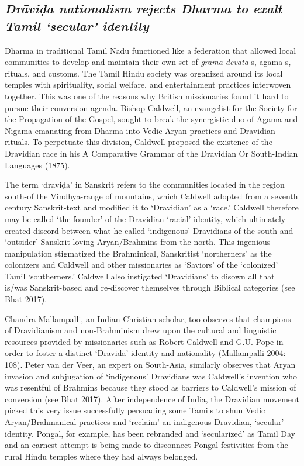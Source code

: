 \subsection*{\textit{Drāviḍa nationalism rejects Dharma to exalt Tamil ‘secular’ identity }}

\vskip -10pt

Dharma in traditional Tamil Nadu functioned like a federation that allowed local communities to develop and maintain their own set of \textit{grāma devatā}-s, āgama-s, rituals, and customs. The Tamil Hindu society was organized around its local temples with spirituality, social welfare, and entertainment practices interwoven together. This was one of the reasons why British missionaries found it hard to pursue their conversion agenda. Bishop Caldwell, an evangelist for the Society for the Propagation of the Gospel, sought to break the synergistic duo of Āgama and Nigama emanating from Dharma into Vedic Aryan practices and Dravidian rituals. To perpetuate this division, Caldwell proposed the existence of the Dravidian race in his A Comparative Grammar of the Dravidian Or South-Indian Languages (1875).

The term ‘draviḍa’ in Sanskrit refers to the communities located in the region south-of the Vindhya-range of mountains, which Caldwell adopted from a seventh century Sanskrit-text and modified it to ‘Dravidian’ as a ‘race.’ Caldwell therefore may be called ‘the founder’ of the Dravidian ‘racial’ identity, which ultimately created discord between what he called ‘indigenous’ Dravidians of the south and ‘outsider’ Sanskrit loving Aryan/Brahmins from the north. This ingenious manipulation stigmatized the Brahminical, Sanskritist ‘northerners’ as the colonizers and Caldwell and other missionaries as ‘Saviors’ of the ‘colonized’ Tamil ‘southerners.’ Caldwell also instigated ‘Dravidians’ to disown all that is/was Sanskrit-based and re-discover themselves through Biblical categories (see Bhat 2017).

Chandra Mallampalli, an Indian Christian scholar, too observes that champions of Dravidianism and non-Brahminism drew upon the cultural and linguistic resources provided by missionaries such as Robert Caldwell and G.U. Pope in order to foster a distinct ‘Dravida’ identity and nationality (Mallampalli 2004: 108). Peter van der Veer, an expert on South-Asia, similarly observes that Aryan invasion and subjugation of ‘indigenous’ Dravidians was Caldwell’s invention who was resentful of Brahmins because they stood as barriers to Caldwell’s mission of conversion (see Bhat 2017). After independence of India, the Dravidian movement picked this very issue successfully persuading some Tamils to shun Vedic Aryan/Brahmanical practices and ‘reclaim’ an indigenous Dravidian, ‘secular’ identity. Pongal, for example, has been rebranded and ‘secularized’ as Tamil Day and an earnest attempt is being made to disconnect Pongal festivities from the rural Hindu temples where they had always belonged.



